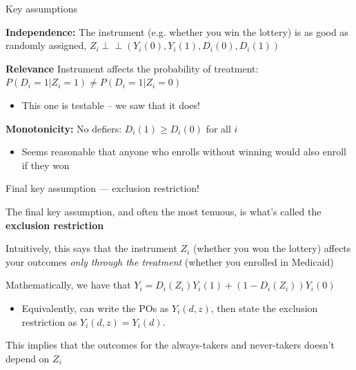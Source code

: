 \documentclass[11pt,english,handout]{beamer}
\newenvironment{wideitemize}{\itemize\addtolength{\itemsep}{10pt}}{\enditemize}
\newcommand{\indep}{\perp\!\!\!\!\perp}
\begin{document}
\begin{frame}{Key assumptions}
	\begin{wideitemize}
	\item
	\textbf{Independence:} The instrument (e.g. whether you win the lottery) is as good as randomly assigned, $Z_i \indep (Y_i(0),Y_i(1), D_i(0), D_i(1))$
	
	\pause
	\item
	\textbf{Relevance} Instrument affects the probability of treatment: $P(D_i = 1 | Z_i = 1) \neq P(D_i = 1 | Z_i = 0)$
		\begin{itemize}
			\item 
			This one is testable -- we saw that it does!
		\end{itemize}
	
	\item
	\textbf{Monotonicity:} No defiers: $D_i(1) \geq D_i(0)$ for all $i$
			\begin{itemize}
				\item 
				Seems reasonable that anyone who enrolls without winning would also enroll if they won
			\end{itemize}

	\end{wideitemize}	
\end{frame}


\begin{frame}{Final key assumption --- exclusion restriction!}
	
	\begin{wideitemize}
		\item
		The final key assumption, and often the most tenuous, is what's called the \textbf{exclusion restriction}
		
		\pause
		\item
		Intuitively, this says that the instrument $Z_i$ (whether you won the lottery) affects your outcomes \textit{only through the treatment} (whether you enrolled in Medicaid)
		
		\pause
		\item
		Mathematically, we have that $Y_i = D_i(Z_i) Y_i(1)  + (1- D_i(Z_i)) Y_i(0) $
		\medskip
			\begin{itemize}
				\item 
				Equivalently, can write the POs as $Y_i(d,z)$, then state the exclusion restriction as $Y_i(d,z) = Y_i(d)$. 
			\end{itemize}
		
		\pause
		\item
		This implies that the outcomes for the always-takers and never-takers doesn't depend on $Z_i$
	\end{wideitemize}
	
	
\end{frame}
\end{document}
